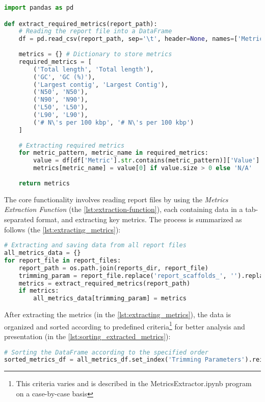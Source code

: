 \begin{lstlisting}[language=Python, caption=Metrics Extraction Function, label={lst:extraction-function}]
import pandas as pd

def extract_required_metrics(report_path):
    # Reading the report file into a DataFrame
    df = pd.read_csv(report_path, sep='\t', header=None, names=['Metric', 'Value'])
    
    metrics = {} # Dictionary to store metrics
    required_metrics = [
        ('Total length', 'Total length'),
        ('GC', 'GC (%)'),
        ('Largest contig', 'Largest Contig'),
        ('N50', 'N50'),
        ('N90', 'N90'),
        ('L50', 'L50'),
        ('L90', 'L90'),
        ('# N\'s per 100 kbp', '# N\'s per 100 kbp')
    ]
    
    # Extracting required metrics
    for metric_pattern, metric_name in required_metrics:
        value = df[df['Metric'].str.contains(metric_pattern)]['Value'].values
        metrics[metric_name] = value[0] if value.size > 0 else 'N/A'
    
    return metrics
\end{lstlisting}

The core functionality involves reading report files by using the \textit{Metrics Extraction Function} (the \autoref{lst:extraction-function}), each containing data in a tab-separated format, and extracting key \gls{metrics}. The process is summarized as follows (the \autoref{lst:extracting_metrics}):

\begin{lstlisting}[language=Python, label={lst:extracting_metrics}, caption=Extracting Metrics from Report Files]
# Extracting and saving data from all report files
all_metrics_data = {}
for report_file in report_files:
    report_path = os.path.join(reports_dir, report_file)
    trimming_param = report_file.replace('report_scaffolds_', '').replace('.tsv', '')
    metrics = extract_required_metrics(report_path)
    if metrics:
        all_metrics_data[trimming_param] = metrics
\end{lstlisting}

After extracting the \gls{metrics} (in the \autoref{lst:extracting_metrics}), the data is organized and sorted according to predefined criteria\footnote{This criteria varies and is described in the MetricsExtractor.ipynb program on a case-by-case basis} for better analysis and presentation (in the \autoref{lst:sorting_extracted_metrics}):

\begin{lstlisting}[language=Python, label={lst:sorting_extracted_metrics}, caption=Sorting Extracted Metrics]
# Sorting the DataFrame according to the specified order
sorted_metrics_df = all_metrics_df.set_index('Trimming Parameters').reindex(sorting_order).reset_index()
\end{lstlisting}


